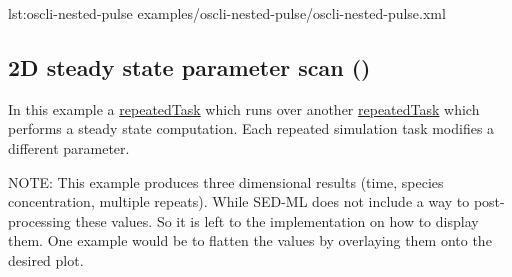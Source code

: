 {lst:oscli-nested-pulse}
{examples/oscli-nested-pulse/oscli-nested-pulse.xml}


\subsection{2D steady state parameter scan ()}
In this example a \hyperref[class:repeatedTask]{repeatedTask} which runs over another \hyperref[class:repeatedTask]{repeatedTask} which performs a steady state computation. Each repeated simulation task modifies a different parameter.

NOTE: This example produces three dimensional results (time, species concentration, multiple repeats). While SED-ML \currentLV does not include a way to post-processing these values. So it is left to the implementation on how to display them. One example would be to flatten the values by overlaying them onto the desired plot. 

